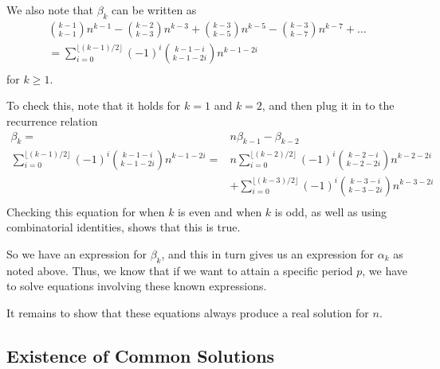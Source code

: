 \documentclass[12pt]{article}
\begin{document}
We also note that $\beta_k$ can be written as 
\begin{align*}
\binom{k-1}{k-1} n^{k-1} - \binom{k-2}{k-3}n^{k-3} +\binom{k-3}{k-5}n^{k-5} -\binom{k-3}{k-7}n^{k-7} + \dots \\
=\sum_{i = 0}^{\lfloor (k-1)/2 \rfloor} (-1)^i\binom{k-1-i}{k-1-2i}n^{k-1-2i}\\
\end{align*}
for $k \geq 1$.

To check this, note that it holds for $k = 1$ and $k = 2$, and then plug it in to the recurrence relation
\begin{align*}
\beta_k =& n\beta_{k-1} - \beta_{k-2}\\
\sum_{i = 0}^{\lfloor (k-1)/2 \rfloor} (-1)^i\binom{k-1-i}{k-1-2i}n^{k-1-2i} = & n \sum_{i = 0}^{\lfloor (k-2)/2 \rfloor} (-1)^i\binom{k-2-i}{k-2-2i}n^{k-2-2i} \\
& +\sum_{i = 0}^{\lfloor (k-3)/2 \rfloor} (-1)^i\binom{k-3-i}{k-3-2i}n^{k-3-2i}\\
\end{align*}
Checking this equation for when $k$ is even and when $k$ is odd, as well as using combinatorial identities, shows that this is true.

So we have an expression for $\beta_k$, and this in turn gives us an expression for $\alpha_k$ as noted above. Thus, we know that if we want to attain a specific period $p$, we have to solve equations involving these known expressions.

It remains to show that these equations always produce a real solution for $n$.

\subsection{Existence of Common Solutions}
\end{document}
